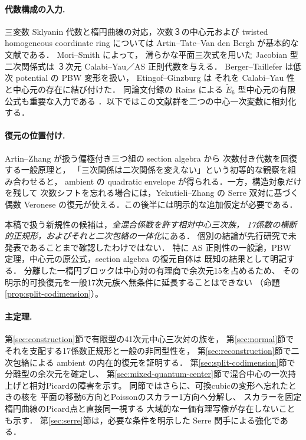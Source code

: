\documentclass[11pt,a4paper]{ltjsarticle}
\numberwithin{equation}{section}
\begin{document}
\paragraph{代数構成の入力.}
三変数 Sklyanin 代数と楕円曲線の対応，次数３の中心元および
twisted homogeneous coordinate ring については
Artin--Tate--Van den Bergh \cite{ATV} が基本的な文献である．
Mori--Smith \cite[Theorem~4.2(1)]{MS} によって，
滑らかな平面三次式を用いた Jacobian 型二次関係式は
３次元 Calabi--Yau／AS 正則代数を与える．
Berger--Taillefer \cite{BT} は低次 potential の PBW 変形を扱い，
Etingof--Ginzburg \cite[Proposition~7.3.1(ii), Theorem~3.3.2]{EG} は
それを Calabi--Yau 性と中心元の存在に結び付けた．
同論文付録の Rains による $\widetilde E_6$ 型中心元の有限公式も重要な入力である
\cite[\S9.1]{EG}．以下ではこの文献群を二つの中心一次変数に相対化する．

\paragraph{復元の位置付け.}
Artin--Zhang \cite{AZ} が扱う偏極付き三つ組の section algebra から
次数付き代数を回復する一般原理と，
「三次関係は二次関係を変えない」という初等的な観察を組み合わせると，
ambient の quadratic envelope が得られる．一方，構造対象だけを残して
次数シフトを忘れる場合には，Yekutieli--Zhang \cite{YZ} の Serre 双対に基づく
偶数 Veronese の復元が使える．この後半には明示的な追加仮定が必要である．

本稿で扱う新規性の候補は，\emph{全混合係数を許す相対中心三次族，
17係数の横断的正規形，およびそれと二次包絡の一体化}にある．
個別の結論が先行研究で未発表であることまで確認したわけではない．
特に AS 正則性の一般論，PBW 定理，中心元の原公式，section algebra の復元自体は
既知の結果として明記する．
分離した一楕円ブロックは中心対の有理商で余次元15を占めるため、
その明示的可換復元を一般17次元族へ無条件に延長することはできない
（命題\ref{prop:split-codimension}）。

\paragraph{主定理.}
第\ref{sec:construction}節で有限型の41次元中心三次対の族を，
第\ref{sec:normal}節でそれを支配する17係数正規形と一般の非同型性を，
第\ref{sec:reconstruction}節で二次包絡による ambient の内在的復元を証明する．
第\ref{sec:split-codimension}節で分離型の余次元を確定し、
第\ref{sec:mixed-quantum-center}節で混合中心の一次持上げと相対Picardの障害を示す。
同節ではさらに、可換cubicの変形へ忘れたときの核を
平面の移動6方向とPoissonのスカラー1方向へ分解し、
スカラーを固定楕円曲線のPicard点と直接同一視する
大域的な一価有理写像が存在しないことも示す．
第\ref{sec:serre}節は，必要な条件を明示した Serre 関手による強化である．
\end{document}
